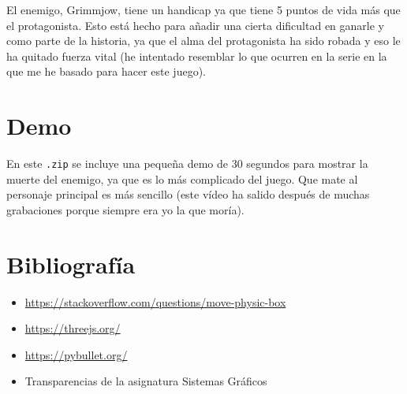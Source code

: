 \documentclass[11pt,a4paper]{article}
\begin{document}
El enemigo, Grimmjow, tiene un handicap ya que tiene 5 puntos de vida más que el protagonista. Esto está hecho para añadir una cierta dificultad en ganarle y como parte de la historia, ya que el alma del protagonista ha sido robada y eso le ha quitado fuerza vital (he intentado resemblar lo que ocurren en la serie en la que me he basado para hacer este juego).

\section{Demo}

En este \texttt{.zip} se incluye una pequeña demo de 30 segundos para mostrar la muerte del enemigo, ya que es lo más complicado del juego. Que mate al personaje principal es más sencillo (este vídeo ha salido después de muchas grabaciones porque siempre era yo la que moría).

\section{Bibliografía}

\begin{itemize}
	\item \color{blue}\href{https://stackoverflow.com/questions/34569703/raycaster-does-not-move-boxmesh-objects}{https://stackoverflow.com/questions/move-physic-box}\color{black}
	\item \color{blue}\href{https://threejs.org/}{https://threejs.org/}\color{black}
	\item \color{blue}\href{https://pybullet.org/Bullet/phpBB3/index.php?sid=0e8c6e5111583be0d17f1731e4c1dc19}{https://pybullet.org/}\color{black}
	\item Transparencias de la asignatura Sistemas Gráficos
\end{itemize}
\end{document}

